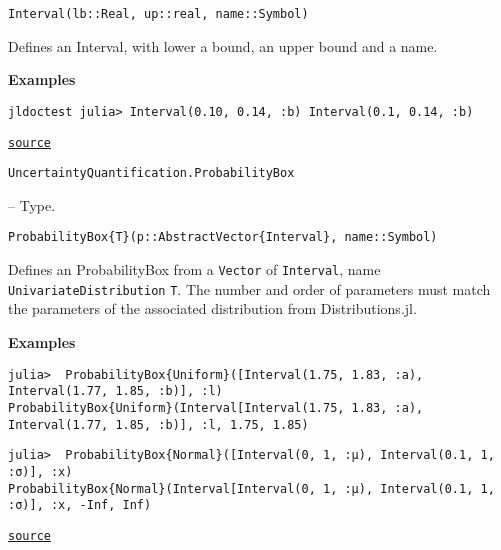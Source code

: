 \begin{adjustwidth}{2em}{0pt}


\begin{verbatim}
Interval(lb::Real, up::real, name::Symbol)
\end{verbatim}

Defines an Interval, with lower a bound, an upper bound and a name.

\textbf{Examples}

\texttt{jldoctest julia> Interval(0.10, 0.14, :b) Interval(0.1, 0.14, :b)}



\href{https://github.com/friesischscott/UncertaintyQuantification.jl/blob/f5ee6cce729f0d6a57979257379c942cdf42f86f/src/inputs/imprecise/interval.jl#L1-L11}{\texttt{source}}


\end{adjustwidth}
\hypertarget{460210473987211826}{\texttt{UncertaintyQuantification.ProbabilityBox}}  -- {Type.}

\begin{adjustwidth}{2em}{0pt}


\begin{verbatim}
ProbabilityBox{T}(p::AbstractVector{Interval}, name::Symbol)
\end{verbatim}

Defines an ProbabilityBox from a \texttt{Vector} of \texttt{Interval}, name \texttt{UnivariateDistribution} \texttt{T}. The number and order of parameters must match the parameters of the associated distribution from Distributions.jl.

\textbf{Examples}


\begin{verbatim}
julia>  ProbabilityBox{Uniform}([Interval(1.75, 1.83, :a), Interval(1.77, 1.85, :b)], :l)
ProbabilityBox{Uniform}(Interval[Interval(1.75, 1.83, :a), Interval(1.77, 1.85, :b)], :l, 1.75, 1.85)
\end{verbatim}


\begin{verbatim}
julia>  ProbabilityBox{Normal}([Interval(0, 1, :μ), Interval(0.1, 1, :σ)], :x)
ProbabilityBox{Normal}(Interval[Interval(0, 1, :μ), Interval(0.1, 1, :σ)], :x, -Inf, Inf)
\end{verbatim}



\href{https://github.com/friesischscott/UncertaintyQuantification.jl/blob/f5ee6cce729f0d6a57979257379c942cdf42f86f/src/inputs/imprecise/p-box.jl#L1-L17}{\texttt{source}}


\end{adjustwidth}


